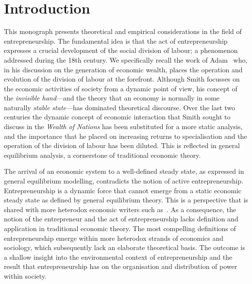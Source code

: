 \setcounter{page}{1} 
\chapter{Introduction}

This monograph presents theoretical and empirical considerations in the field of entrepreneurship. The fundamental idea is that the act of entrepreneurship expresses a crucial development of the social division of labour; a phenomenon addressed during the 18th century. We specifically recall the work of Adam~\citet{Smith1776} who, in his discussion on the generation of economic wealth, places the operation and evolution of the division of labour at the forefront. Although Smith focusses on the economic activities of society from a dynamic point of view, his concept of the \emph{invisible hand}---and the theory that an economy is normally in some naturally \emph{stable state}---has dominated theoretical discourse. Over the last two centuries the dynamic concept of economic interaction that Smith sought to discuss in the \emph{Wealth of Nations} has been substituted for a more static analysis, and the importance that he placed on increasing returns to specialisation and the operation of the division of labour has been diluted. This is reflected in general equilibrium analysis, a cornerstone of traditional economic theory. 


The arrival of an economic system to a well-defined steady state, as expressed in general equilibrium modelling, contradicts the notion of active entrepreneurship. Entrepreneurship is a dynamic force that cannot emerge from a static economic steady state as defined by general equilibrium theory. This is a perspective that is shared with more heterodox economic writers such as~\citet{Schumpeter1942}. As a consequence, the notion of the entrepreneur and the act of entrepreneurship lacks definition and application in traditional economic theory. The most compelling definitions of entrepreneurship emerge within more heterodox strands of economics and sociology, which subsequently lack an elaborate theoretical basis. The outcome is a shallow insight into the environmental context of entrepreneurship and the result that entrepreneurship has on the organisation and distribution of power within society.

